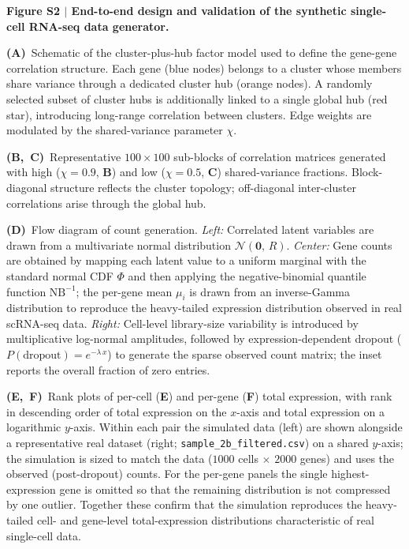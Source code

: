 
\textbf{Figure S2 $|$ End-to-end design and validation of the synthetic single-cell RNA-seq
data generator.}

\textbf{(A)}~Schematic of the cluster-plus-hub factor model used to define the gene-gene
correlation structure.
Each gene (blue nodes) belongs to a cluster whose members share variance through a
dedicated cluster hub (orange nodes).
A randomly selected subset of cluster hubs is additionally linked to a single global hub
(red star), introducing long-range correlation between clusters.
Edge weights are modulated by the shared-variance parameter $\chi$.

\textbf{(B,~C)}~Representative $100\times 100$ sub-blocks of correlation matrices generated
with high ($\chi = 0.9$, \textbf{B}) and low ($\chi = 0.5$, \textbf{C})
shared-variance fractions.
Block-diagonal structure reflects the cluster topology; off-diagonal inter-cluster
correlations arise through the global hub.

\textbf{(D)}~Flow diagram of count generation.
\textit{Left:} Correlated latent variables are drawn from a multivariate normal
distribution $\mathcal{N}(\mathbf{0},\,R)$.
\textit{Center:} Gene counts are obtained by mapping each latent value to a uniform
marginal with the standard normal CDF $\Phi$ and then applying the negative-binomial
quantile function $\mathrm{NB}^{-1}$; the per-gene mean $\mu_i$ is drawn from an
inverse-Gamma distribution to reproduce the heavy-tailed expression distribution observed
in real scRNA-seq data.
\textit{Right:} Cell-level library-size variability is introduced by multiplicative
log-normal amplitudes, followed by expression-dependent dropout
($P(\text{dropout}) = e^{-\lambda\,x}$) to generate the sparse observed count matrix;
the inset reports the overall fraction of zero entries.

\textbf{(E,~F)}~Rank plots of per-cell (\textbf{E}) and per-gene (\textbf{F}) total
expression, with rank in descending order of total expression on the $x$-axis and total
expression on a logarithmic $y$-axis.
Within each pair the simulated data (left) are shown alongside a representative real
dataset (right; \texttt{sample\_2b\_filtered.csv}) on a shared $y$-axis; the simulation is
sized to match the data ($1000$ cells $\times$ $2000$ genes) and uses the observed
(post-dropout) counts.
For the per-gene panels the single highest-expression gene is omitted so that the
remaining distribution is not compressed by one outlier.
Together these confirm that the simulation reproduces the heavy-tailed cell- and gene-level
total-expression distributions characteristic of real single-cell data.

